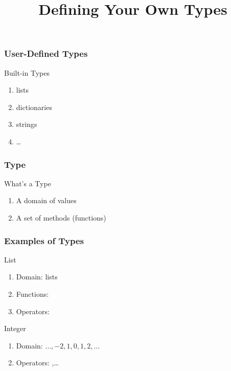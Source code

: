 
\title{Defining Your Own Types}


\frame{\maketitle}

\begin{frame}[fragile] 
\frametitle{User-Defined Types}

\begin{block}{Built-in Types}
\begin{enumerate}
\item lists
\item dictionaries
\item strings
\item \ldots
\end{enumerate}
\end{block}
\end{frame}

\begin{frame}[fragile] 
\frametitle{Type}
\begin{block}{What's a Type}
\begin{enumerate}
\item A domain of values
\item A set of methods (functions)
\end{enumerate}
\end{block}

\end{frame}

\begin{frame}[fragile] 
\frametitle{Examples of Types}

\begin{block}{List}
\begin{enumerate}
\item Domain: lists
\item Functions: 
\item Operators: 
\end{enumerate}
\end{block}

\pause
\begin{block}{Integer}
\begin{enumerate}
\item Domain: $\dots,-2, 1, 0, 1, 2, \dots$
\item Operators: ,\ldots
\end{enumerate}
\end{block}
\end{frame}

